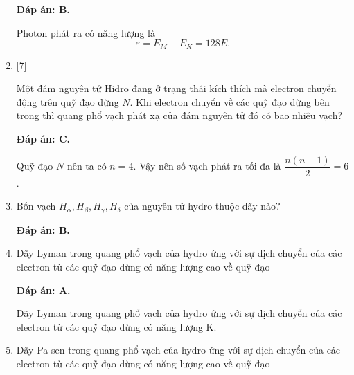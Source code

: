 \begin{enumerate}[label=\bfseries Câu \arabic*:]
	\loigiai
	{		\textbf{Đáp án: B.}
		
		Photon phát ra có năng lượng là
		$$
		\varepsilon = E_{M} - E_{K} = 128E.
		$$
	}	
	
	\item {} [7]
		\cauhoi
	{ Một đám nguyên tử Hidro đang ở trạng thái kích thích mà electron chuyển động trên quỹ đạo dừng $ N $. Khi electron chuyển về các quỹ đạo dừng bên trong thì quang phổ vạch phát xạ của đám nguyên tử đó có bao nhiêu vạch?
		
	}
	
	\loigiai
	{		\textbf{Đáp án: C.}
		
		Quỹ đạo $ N $ nên ta có $ n = 4 $. Vậy nên số vạch phát ra tối đa là $ \dfrac{n(n-1)}{2} = 6 $.
	}	
		\item {}
		\cauhoi
	{ Bốn vạch $H_\alpha, H_\beta, H_\gamma, H_\delta$ của nguyên tử hydro thuộc dãy nào?
		
		
	}
	
	\loigiai
	{		\textbf{Đáp án: B.}
		
		
	}	
		\item {}
		\cauhoi
	{ 
		Dãy Lyman trong quang phổ vạch của hydro ứng với sự dịch chuyển của các electron từ các quỹ đạo dừng có năng lượng cao về quỹ đạo
		
	}
	
	\loigiai
	{		\textbf{Đáp án: A.}
		
		Dãy Lyman trong quang phổ vạch của hydro ứng với sự dịch chuyển của các electron từ các quỹ đạo dừng có năng lượng K. 
	}	
		\item {}
		\cauhoi
	{ 
		Dãy Pa-sen trong quang phổ vạch của hydro ứng với sự dịch chuyển của các electron từ các quỹ đạo dừng có năng lượng cao về quỹ đạo 
		
}
\end{enumerate}
